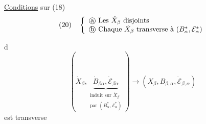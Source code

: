 \uline{Conditions} sur (18)
\[
(20)\quad\left\{
\begin{array}{l}
\text{\textcircled{a} Les }\dot X_\beta\text{ disjoints}\\
\text{\textcircled{b} Chaque }\dot X_\beta\text{ transverse à }(B_\alpha^*,\mathcal E_\alpha^*)
\end{array}\right.
\]


\textcircled{d}
\[
(\dot X_\beta,
\underbrace{\dot B_{\beta\alpha},\dot{\mathcal E}_{\beta\alpha}}
_{\substack{\text{induit sur }\dot X_\beta\\
\text{par }(B_\alpha^*,\mathcal E_\alpha^*)}})
\longrightarrow
(X_\beta,B_{\beta,\alpha},\dot{\mathcal E}_{\beta,\alpha})
\]
est transverse
